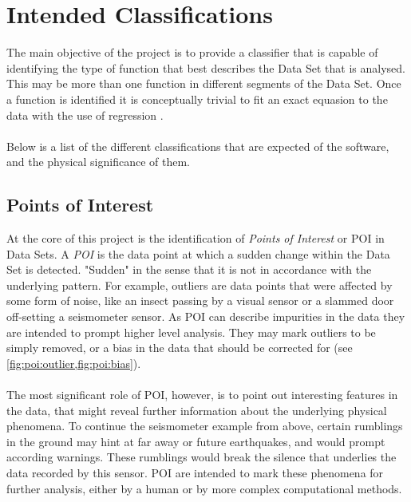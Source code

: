 \documentclass[main.tex]{subfiles}
\begin{document}
  
  \section{Intended Classifications}
  
    The main objective of the project is to provide a classifier that is capable of identifying the type of function that best describes the Data Set that is analysed. This may be more than one function in different segments of the Data Set. Once a function is identified it is conceptually trivial to fit an exact equasion to the data with the use of regression \cite{}. 
    \\\\
    Below is a list of the different classifications that are expected of the software, and the physical significance of them.
    
    \subsection{Points of Interest}  
    \label{sec:POI}
    
    At the core of this project is the identification of \textit{Points of Interest} or POI in Data Sets. A \textit{POI} is the data point at which a sudden change within the Data Set is detected. "Sudden" in the sense that it is not in accordance with the underlying pattern. For example, outliers are data points that were affected by some form of noise, like an insect passing by a visual sensor or a slammed door off-setting a seismometer sensor. As POI can describe impurities in the data they are intended to prompt higher level analysis. They may mark outliers to be simply removed, or a bias in the data that should be corrected for (see \cref{fig:poi:outlier,fig:poi:bias}). 
    \\\\
    The most significant role of POI, however, is to point out interesting features in the data, that might reveal further information about the underlying physical phenomena. To continue the seismometer example from above, certain rumblings in the ground may hint at far away or future earthquakes, and would prompt according warnings. These rumblings would break the silence that underlies the data recorded by this sensor. POI are intended to mark these phenomena for further analysis, either by a human or by more complex computational methods.
    
\end{document}
